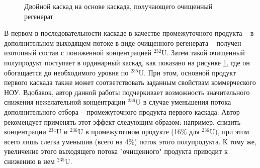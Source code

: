 \begin{figure}[ht]
  \caption{Двойной каскад на основе каскада, получающего очищенный регенерат}\label{fig:int_double}
\end{figure}

В первом в последовательности каскаде в качестве промежуточного продукта -- в дополнительном выходящем потоке в виде очищенного регенерата -- получен изотопный состав с пониженной концентрацией $^{232}$U.
Затем такой очищенный полупродукт поступает в ординарный каскад, как показано на рисунке \ref{fig:int_double}, где он обогащается до необходимого уровня по $^{235}$U.
При этом, основной продукт первого каскада также может соответствовать заданным свойствам коммерческого НОУ.
Вдобавок, автор данной работы подчеркивает возможность значительного снижения нежелательной концентрации $^{236}$U в случае уменьшения потока дополнительного отбора -- промежуточного продукта первого каскада.
Автор рекомендует применять этот эффект следующим образом: например, снизить концентрации  $^{234}$U и  $^{236}$U в промежуточном продукте (16\% для  $^{236}$U), при этом всего лишь слегка уменьшив (всего на 4\%) поток этого полупродукта.
К тому же, увеличение этого выходящего потока "очищенного" продукта приводит к снижению в нем $^{235}$U.

